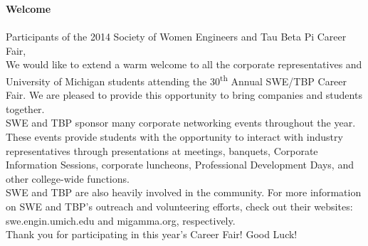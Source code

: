 \documentclass[twoside]{article}
\begin{document}
    
    \startforewardsection
    { \fontsize{16}{19}\selectfont \bf Welcome}\\~\\Participants of the 2014 Society of Women Engineers and Tau Beta Pi Career Fair, 
~\\

    We would like to extend a warm welcome to all the corporate representatives and University of Michigan students attending the 30\textsuperscript{th} Annual SWE/TBP Career Fair. We are pleased to provide this opportunity to bring companies and students together. 
~\\

    SWE and TBP sponsor many corporate networking events throughout the year. These events provide students with the opportunity to interact with industry representatives through presentations at meetings, banquets, Corporate Information Sessions, corporate luncheons, Professional Development Days, and other college-wide functions. 
~\\

    SWE and TBP are also heavily involved in the community. For more information on SWE and TBP's outreach and volunteering efforts, check out their websites: swe.engin.umich.edu and migamma.org, respectively.
~\\

    Thank you for participating in this year's Career Fair! Good Luck!
~\\

    
~\\
\end{document}
